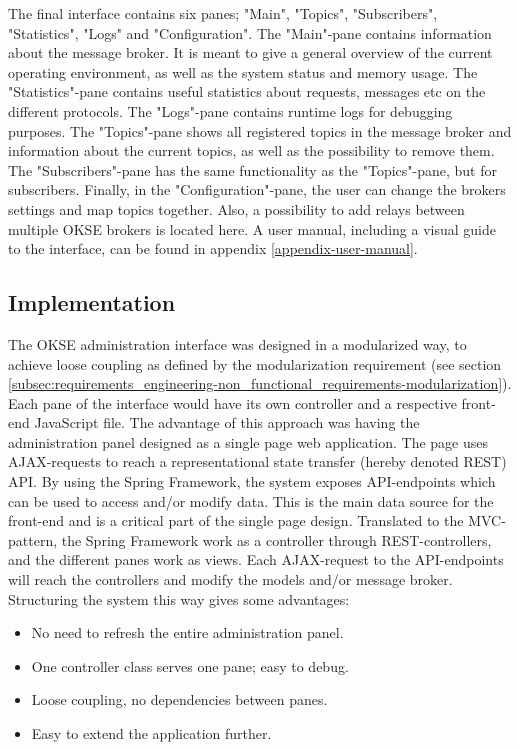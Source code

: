 The final interface contains six panes; "Main", "Topics", "Subscribers", "Statistics", "Logs" and "Configuration". The "Main"-pane contains information about the message broker. It is meant to give a general overview of the current operating environment, as well as the system status and memory usage. The "Statistics"-pane contains useful statistics about requests, messages etc on the different protocols. The "Logs"-pane contains runtime logs for debugging purposes. The "Topics"-pane shows all registered topics in the message broker and information about the current topics, as well as the possibility to remove them. The "Subscribers"-pane has the same functionality as the "Topics"-pane, but for subscribers. Finally, in the "Configuration"-pane, the user can change the brokers settings and map topics together. Also, a possibility to add relays between multiple OKSE brokers is located here. A user manual, including a visual guide to the interface, can be found in appendix \ref{appendix-user-manual}.

\subsection{Implementation}
\label{subsec:architecture_and_implementation-implementation}

The OKSE administration interface was designed in a modularized way, to achieve loose coupling as defined by the modularization requirement (see section  \ref{subsec:requirements_engineering-non_functional_requirements-modularization}). Each pane of the interface would have its own controller and a respective front-end JavaScript file. The advantage of this approach was having the administration panel designed as a single page web application. The page uses AJAX-requests to reach a representational state transfer (hereby denoted REST) API. By using the Spring Framework, the system exposes API-endpoints which can be used to access and/or modify data. This is the main data source for the front-end and is a critical part of the single page design. Translated to the MVC-pattern, the Spring Framework work as a controller through REST-controllers, and the different panes work as views. Each AJAX-request to the API-endpoints will reach the controllers and modify the models and/or message broker. Structuring the system this way gives some advantages: 

\begin{itemize}
    \item No need to refresh the entire administration panel.
    \item One controller class serves one pane; easy to debug.
    \item Loose coupling, no dependencies between panes.
    \item Easy to extend the application further.
\end{itemize}

